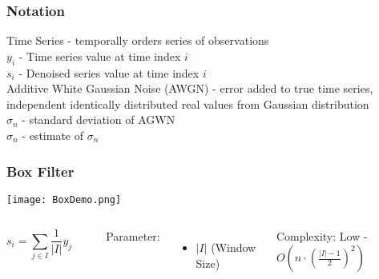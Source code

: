 \documentclass{beamer}
\begin{document}
\begin{frame}
\begin{center}
\frametitle{Notation}

Time Series - temporally orders series of observations\\

$ $\\

$y_i$ - Time series value at time index $i$\\

$s_i$ - Denoised series value at time index $i$\\

$ $\\

$ $\\

Additive White Gaussian Noise (AWGN) - error added to true time series, independent identically distributed real values from Gaussian distribution\\

$ $\\

$\sigma_n$ - standard deviation of AGWN\\

$\hat{\sigma}_n$ - estimate of $\sigma_n$

\end{center}
\end{frame}


\begin{frame}
\begin{center}
\frametitle{Box Filter}

\texttt{[image: BoxDemo.png]}

\begin{columns}[c]

\column{2.5 in}
\centering

\begin{displaymath}
s_i = \sum _{j \in I} \frac{1}{\lvert I \rvert} y_j
\end{displaymath}

$ $\\

\column{2.5 in}
\justifying

Parameter:

\begin{itemize}

\item $\lvert I \rvert$ (Window Size)\\

\end{itemize}

Complexity: Low - $O \left( n \cdot \left( \frac{\lvert I \rvert - 1}{2} \right) ^2 \right)$

\end{columns}

\end{center}
\end{frame}
\end{document}
